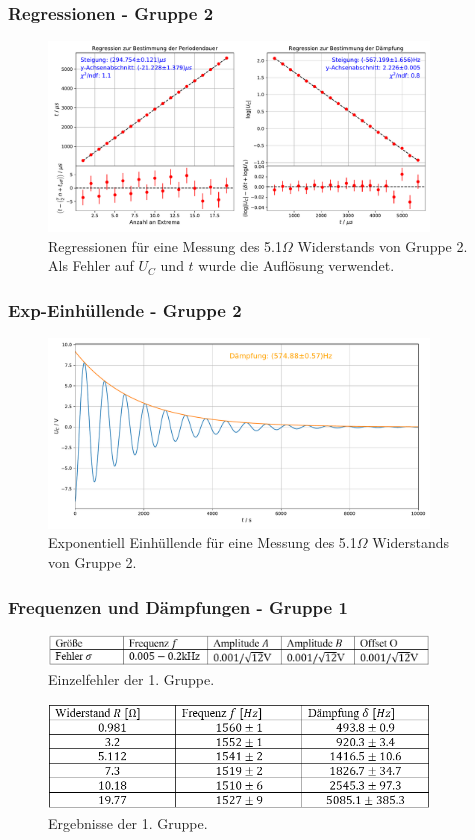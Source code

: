 \documentclass{beamer}
\begin{document}
\begin{frame}
\frametitle{Regressionen - Gruppe 2}
\begin{figure}
\centering
\includegraphics[width=0.9\textwidth]{abbildungen/reg_schwingung_grp2.pdf}
\caption{Regressionen für eine Messung des 5.1$\Omega$ Widerstands von Gruppe 2. Als Fehler auf $U_C$ und $t$ wurde die Auflösung verwendet.}
\end{figure}
\end{frame}

\begin{frame}
\frametitle{Exp-Einhüllende - Gruppe 2}
\begin{figure}
\centering
\includegraphics[width=0.9\textwidth]{abbildungen/exp_grp2.pdf}
\caption{Exponentiell Einhüllende für eine Messung des 5.1$\Omega$ Widerstands von Gruppe 2.}
\end{figure}
\end{frame}


\begin{frame}
\frametitle{Frequenzen und Dämpfungen - Gruppe 1}
\begin{figure}
\centering
\includegraphics[width=0.9\textwidth]{abbildungen/1VFehler.PNG}
\caption{Einzelfehler der 1. Gruppe.}
\end{figure}

\begin{figure}
\centering
\includegraphics[width=0.9\textwidth]{abbildungen/1VWerte.PNG}
\caption{Ergebnisse der 1. Gruppe.}
\end{figure}
\end{frame}
\end{document}
